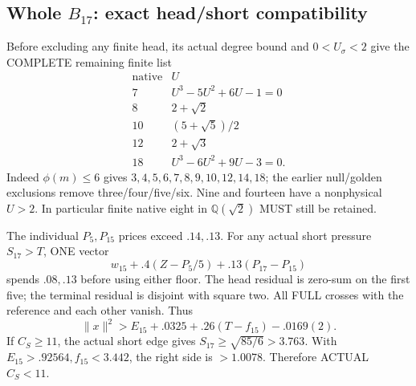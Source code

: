 \subsection{Whole \(B_{17}\): exact head/short compatibility}
\label{app:arithB17compatibility}

Before excluding any finite head, its actual
degree bound and \(0<U_\sigma<2\) give the
COMPLETE remaining finite list
\[
\begin{array}{c|c}
 \text{native}&U\\ \hline
7&U^3-5U^2+6U-1=0\\
8&2+\sqrt2\\
10&(5+\sqrt5)/2\\
12&2+\sqrt3\\
18&U^3-6U^2+9U-3=0 .
\end{array}
\]
Indeed \(\phi(m)\le6\) gives
\(3,4,5,6,7,8,9,10,12,14,18\);
the earlier null/golden exclusions remove
three/four/five/six.
Nine and fourteen have a nonphysical \(U>2\).
In particular finite native eight in
\(\mathbb Q(\sqrt2)\) MUST still be retained.

The individual \(P_5,P_{15}\) prices exceed
\(.14,.13\).
For any actual short pressure \(S_{17}>T\),
ONE vector
\[
 w_{15}+.4(Z-P_5/5)+.13(P_{17}-P_{15})
\]
spends \(.08,.13\) before using either floor.
The head residual is zero-sum on the first five;
the terminal residual is disjoint with square two.
All FULL crosses with the reference and each
other vanish.
Thus
\[
                 \|x\|^2>
                 E_{15}+.0325+.26(T-f_{15})-.0169(2).
\]
If \(C_S\ge11\), the actual short edge gives
\(S_{17}\ge\sqrt{85/6}>3.763\).
With \(E_{15}>.92564,f_{15}<3.442\),
the right side is \(>1.0078\).
Therefore ACTUAL \(C_S<11\).

